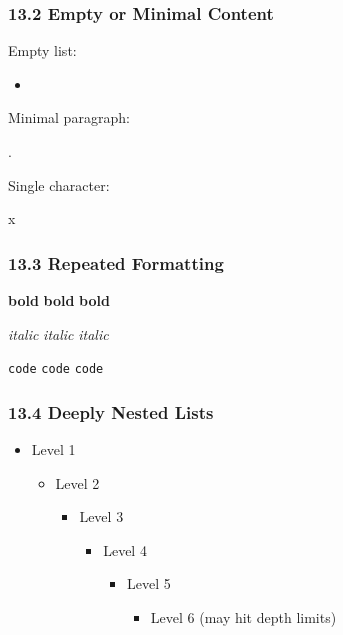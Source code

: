 \documentclass{article}
\begin{document}
\subsubsection{ 13.2 Empty or Minimal Content}

Empty list:

\begin{itemize}
\item 
\end{itemize}

Minimal paragraph:

.

Single character:

x

\subsubsection{ 13.3 Repeated Formatting}

\textbf{bold} \textbf{bold} \textbf{bold}

\emph{italic} \emph{italic} \emph{italic}

\texttt{code} \texttt{code} \texttt{code}

\subsubsection{ 13.4 Deeply Nested Lists}

\begin{itemize}
\item  Level 1
\begin{itemize}
\item  Level 2
\begin{itemize}
\item  Level 3
\begin{itemize}
\item  Level 4
\begin{itemize}
\item  Level 5
\begin{itemize}
\item  Level 6 (may hit depth limits)
\end{itemize}


\end{itemize}


\end{itemize}


\end{itemize}


\end{itemize}


\end{itemize}
\end{document}
